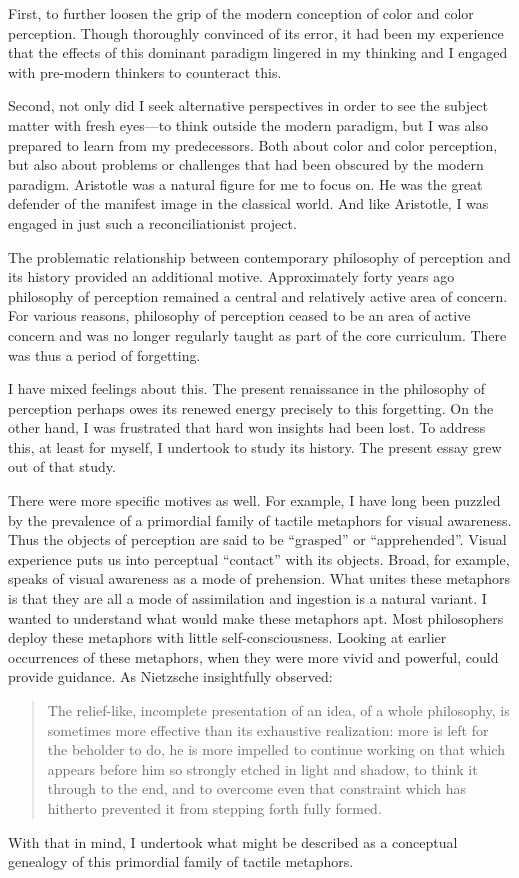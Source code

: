 First, to further loosen the grip of the modern conception of color and color perception. Though thoroughly convinced of its error, it had been my experience that the effects of this dominant paradigm lingered in my thinking and I engaged with pre-modern thinkers to counteract this. 

Second, not only did I seek alternative perspectives in order to see the subject matter with fresh eyes---to think outside the modern paradigm, but I was also prepared to learn from my predecessors. Both about color and color perception, but also about problems or challenges that had been obscured by the modern paradigm. Aristotle was a natural figure for me to focus on. He was the great defender of the manifest image in the classical world. And like Aristotle, I was engaged in just such a reconciliationist project.

The problematic relationship between contemporary philosophy of perception and its history provided an additional motive. Approximately forty years ago philosophy of perception remained a central and relatively active area of concern. For various reasons, philosophy of perception ceased to be an area of active concern and was no longer regularly taught as part of the core curriculum. There was thus a period of forgetting. 

I have mixed feelings about this. The present renaissance in the philosophy of perception perhaps owes its renewed energy precisely to this forgetting. On the other hand, I was frustrated that hard won insights had been lost. To address this, at least for myself, I undertook to study its history. The present essay grew out of that study.

There were more specific motives as well. For example, I have long been puzzled by the prevalence of a primordial family of tactile metaphors for visual awareness. Thus the objects of perception are said to be ``grasped'' or ``apprehended''. Visual experience puts us into perceptual ``contact'' with its objects. Broad, for example, speaks of visual awareness as a mode of prehension. What unites these metaphors is that they are all a mode of assimilation and ingestion is a natural variant. I wanted to understand what would make these metaphors apt. Most philosophers deploy these metaphors with little self-consciousness. Looking at earlier occurrences of these metaphors, when they were more vivid and powerful, could provide guidance. As Nietzsche insightfully observed:
\begin{quote}
The relief-like, incomplete presentation of an idea, of a whole philosophy, is sometimes more effective than its exhaustive realization: more is left for the beholder to do, he is more impelled to continue working on that which appears before him so strongly etched in light and shadow, to think it through to the end, and to overcome even that constraint which has hitherto prevented it from stepping forth fully formed. \citep[§178 92]{Nietzsche:1996na}
\end{quote}
With that in mind, I undertook what might be described as a conceptual genealogy of this primordial family of tactile metaphors.

